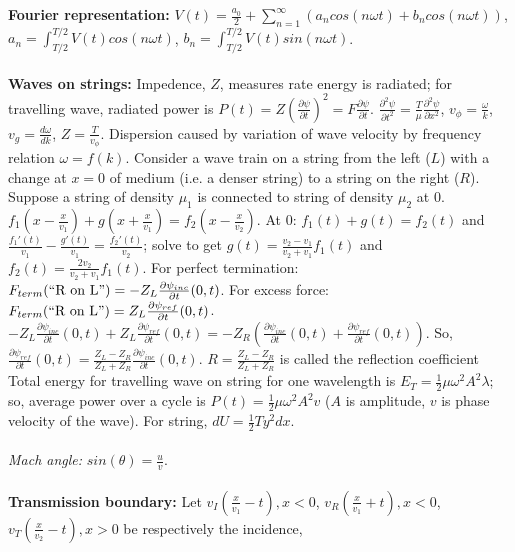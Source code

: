 {\bf Fourier representation:} $V(t)= {\frac {a_0}{2}} + \sum_{n=1}^{\infty} (
a_n cos(n \omega t) + b_n cos(n \omega t))$, 
$a_n= \int_{T/2}^{T/2} V(t) cos(n \omega t)$,
$b_n= \int_{T/2}^{T/2} V(t) sin(n \omega t)$.
\\
\\
{\bf Waves on strings:}  Impedence, $Z$, measures rate energy is radiated;
for travelling wave, radiated power is
$P(t)= Z ({\frac {\partial \psi} {\partial t}})^2= F {\frac {\partial \psi} {\partial t}}$.
$ {\frac {\partial^2 \psi} {\partial t^2}} =
{\frac T {\mu}} {\frac {\partial^2 \psi} {\partial x^2}}$,
$v_{\phi}={\frac \omega k}$,
$v_{g}={\frac {d\omega} {dk}}$, $Z= {\frac {T} {v_{\phi}}}$.
Dispersion caused by variation of wave velocity by frequency
relation $\omega= f(k)$.  
Consider a wave train on a string from the left ($L$) with a change
at $x=0$ of medium (i.e. a denser string) to a string on the right ($R$).
Suppose a string of density $\mu_1$ is connected
to string of density $\mu_2$ at $0$.  $f_1(x-{\frac {x} {v_1}}) + g(x+{\frac {x} {v_1}})
= f_2 (x- {\frac {x} {v_2}})$.  At $0$: $f_1(t)+g(t)=f_2(t)$ and
${\frac {f_1'(t)} {v_1}}-{\frac {g'(t)} {v_1}} = {\frac {f_2'(t)} {v_2}}$;
solve to get $g(t)= {\frac {v_2 - v_1} {v_2+v_1}} f_1(t)$ and
$f_2(t)= {\frac {2v_2} {v_2+v_1}} f_1(t)$.
For perfect termination:
$F_{\small {term}} (\textnormal{``R on L''})= -
Z_L {\frac {\partial \psi_{inc}} {\partial t}} (0,t)$.
For excess force:
$F_{\small{term}} (\textnormal{``R on L''})= Z_L 
{\frac {\partial \psi_{ref}} {\partial t}} (0,t)$.
$-Z_L {\frac {\partial \psi_{inc}} {\partial t}} (0,t)+
Z_L {\frac {\partial \psi_{ref}} {\partial t}} (0,t) =
-Z_R ({\frac {\partial \psi_{inc}} {\partial t}} (0,t)+
{\frac {\partial \psi_{ref}} {\partial t}} (0,t))$.  So,
${\frac {\partial \psi_{ref}} {\partial t}} (0,t)=
{\frac {Z_L - Z_R} {Z_L + Z_R}}
{\frac {\partial \psi_{inc}} {\partial t}} (0,t)$.
$R= {\frac {Z_L - Z_R} {Z_L + Z_R}}$ is called the reflection coefficient
Total energy for travelling wave on string for one wavelength is
$E_T= {\frac 1 2} \mu \omega^2 A^2 \lambda$; so, average power over a
cycle is $P(t)= {\frac 1 2} \mu \omega^2 A^2 v$ ($A$ is amplitude, $v$ is
phase velocity of the wave). For string, $dU = {\frac 1 2} T y^2 dx$.\\
\\
\emph{Mach angle:} $sin( \theta)= {\frac u v}$.  \\
\\
{\bf Transmission boundary:} Let 
$v_I({\frac {x}{v_1}}-t), x < 0$,
$v_R({\frac {x}{v_1}}+t), x < 0$,
$v_T({\frac {x}{v_2}}-t), x > 0$ be respectively the incidence,
